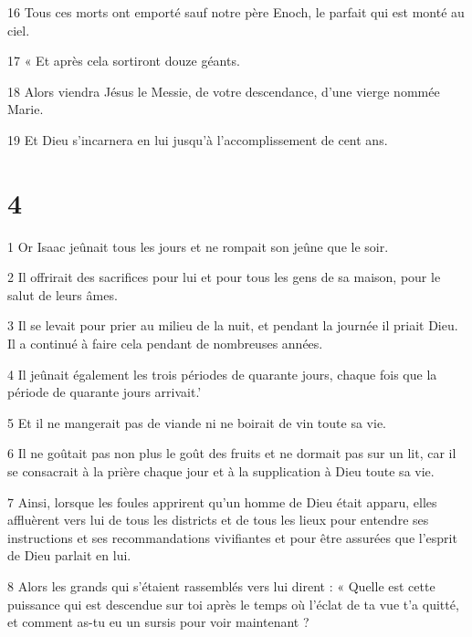 \par 16 Tous ces morts ont emporté sauf notre père Enoch, le parfait qui est monté au ciel.

\par 17 « Et après cela sortiront douze géants.

\par 18 Alors viendra Jésus le Messie, de votre descendance, d'une vierge nommée Marie.

\par 19 Et Dieu s'incarnera en lui jusqu'à l'accomplissement de cent ans.

\chapter{4}

\par 1 Or Isaac jeûnait tous les jours et ne rompait son jeûne que le soir.

\par 2 Il offrirait des sacrifices pour lui et pour tous les gens de sa maison, pour le salut de leurs âmes.

\par 3 Il se levait pour prier au milieu de la nuit, et pendant la journée il priait Dieu. Il a continué à faire cela pendant de nombreuses années.

\par 4 Il jeûnait également les trois périodes de quarante jours, chaque fois que la période de quarante jours arrivait.'

\par 5 Et il ne mangerait pas de viande ni ne boirait de vin toute sa vie.

\par 6 Il ne goûtait pas non plus le goût des fruits et ne dormait pas sur un lit, car il se consacrait à la prière chaque jour et à la supplication à Dieu toute sa vie.

\par 7 Ainsi, lorsque les foules apprirent qu'un homme de Dieu était apparu, elles affluèrent vers lui de tous les districts et de tous les lieux pour entendre ses instructions et ses recommandations vivifiantes et pour être assurées que l'esprit de Dieu parlait en lui.

\par 8 Alors les grands qui s'étaient rassemblés vers lui dirent : « Quelle est cette puissance qui est descendue sur toi après le temps où l'éclat de ta vue t'a quitté, et comment as-tu eu un sursis pour voir maintenant ?

